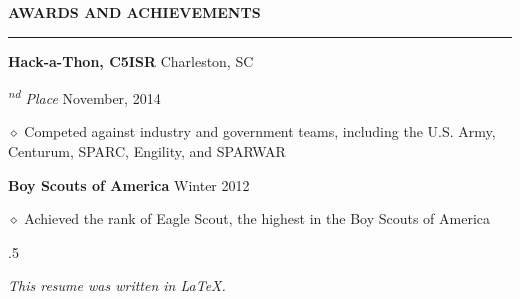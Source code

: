 \documentclass[executivepaper]{extarticle}
\begin{document}
\begin{center}
{\begin{minipage}{7.0in}
\vspace{3mm}


{\noindent \textbf{\fontsize{10}{9}\selectfont AWARDS AND ACHIEVEMENTS}}

\vspace{-3mm}

\noindent \rule{\textwidth}{0.5pt}

\vspace{-1mm}

{\noindent \textbf{\fontsize{9}{8}\selectfont Hack-a-Thon, C5ISR}} {\hfill \fontsize{9}{8}\selectfont Charleston, SC}

{\noindent \textit{\fontsize{9}{8}\textsuperscript{nd} Place}} {\hfill \fontsize{9}{8}\selectfont November, 2014}

{\noindent $\diamond$ {\fontsize{9}{8}\selectfont Competed against industry and government teams, including the U.S. Army, Centurum, SPARC, Engility, and SPARWAR}}

{\noindent \textbf{\fontsize{9}{8}\selectfont Boy Scouts of America}} {\hfill \fontsize{9}{8}\selectfont Winter 2012}

{\noindent $\diamond$ {\fontsize{9}{8}\selectfont Achieved the rank of Eagle Scout, the highest in the Boy Scouts of America}}

\vspace{5mm}



\moveleft.5\hoffset\centerline{{\small\sl This resume was written in \LaTeX.}}

\end{minipage}

}

\end{center}
\end{document}
